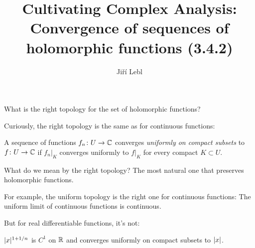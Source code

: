 \documentclass[10pt,aspectratio=169]{beamer}
\author{Ji\v{r}\'i Lebl}
\institute[OSU]{%
Departemento pri Matematiko de Oklahoma {\^S}tata Universitato}
\title{Cultivating Complex Analysis:\\%
Convergence of sequences of holomorphic functions (3.4.2)}
\date{}
\begin{document}
\begin{frame}
\titlepage
\end{frame}

\begin{frame}
What is the right topology for the set of holomorphic functions?

\medskip
\pause

Curiously, the right topology is the same as for continuous functions:

\begin{definition}
A sequence of functions $f_n \colon U \to {\mathbb{C}}$ converges
\emph{uniformly on compact subsets}
to $f \colon U \to {\mathbb{C}}$ if
$f_n|_K$ converges uniformly to $f|_K$
for every compact $K \subset U$.
\end{definition}

\medskip
\pause

What do we mean by the right topology?  The most natural one that preserves
holomorphic functions.

\medskip
\pause

For example, the uniform topology is the right one for continuous functions:
The uniform limit of continuous functions is continuous.

\medskip
\pause

But for real differentiable functions, it's not:

\medskip
\pause

$\lvert {x} \rvert^{1+1/n}$ is $C^1$ on ${\mathbb{R}}$ and converges uniformly on compact
subsets to $\lvert {x} \rvert$.
\end{frame}
\end{document}
